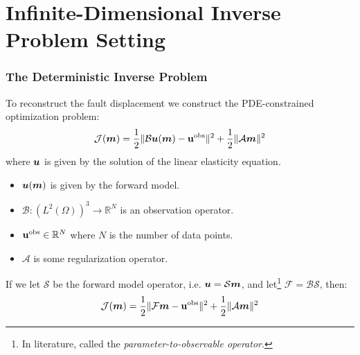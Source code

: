 \documentclass[
  pdf,
  10pt,
  xcolor={svgnames},
]{beamer}
\newcommand{\mc}[1]{\mathcal{#1}}
\newcommand{\R}{\mathbb{R}}
\renewcommand{\vec}[1]{{\mathchoice
                     {\mbox{\boldmath$\displaystyle{#1}$}}
                     {\mbox{\boldmath$\textstyle{#1}$}}
                     {\mbox{\boldmath$\scriptstyle{#1}$}}
                     {\mbox{\boldmath$\scriptscriptstyle{#1}$}}}}
\newcommand{\obs}{\mathbf{u}^{\rm obs}}
\begin{document}
\section{Infinite-Dimensional Inverse Problem Setting}
\begin{frame}
  \frametitle{The Deterministic Inverse Problem}
  To reconstruct the fault displacement we construct the PDE-constrained
  optimization problem:
  \[
    \mc{J}(\vec{m})
    = \frac{1}{2} \| \mc{B}\vec{u}(\vec{m}) - \obs \|^2
    + \frac{1}{2} \| \mc{A}\vec{m} \|^2
  \]
  where $\vec{u}$ is given by the solution of the linear elasticity equation.
  \begin{itemize}
    \item $\vec{u}(\vec{m})$ is given by the forward model.
    \item $\mc{B}: (L^2(\Omega))^3 \to \R^N$ is an observation operator.
    \item $\obs \in \R^N$ where $N$ is the number of data points.
    \item $\mc{A}$ is some regularization operator.
  \end{itemize}
  \pause
  If we let $\mc{S}$ be the forward model operator, i.e. $\vec{u} = \mc{S}
  \vec{m}$, and let\footnote{%
    In literature, called the {\em parameter-to-observable operator}.
  } $\mc{F} = \mc{B} \mc{S}$, then:
  \[
    \mc{J}(\vec{m})
    = \frac{1}{2} \| \mc{F}\vec{m} - \obs \|^2
    + \frac{1}{2} \| \mc{A}\vec{m} \|^2
  \]
\end{frame}
\end{document}
